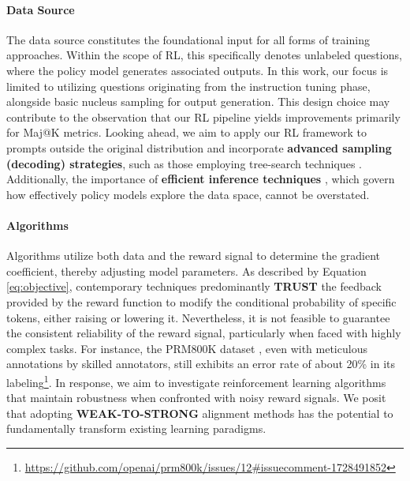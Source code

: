 \begin{itemize}[topsep=0pt]
\paragraph{Data Source} The data source constitutes the foundational input for all forms of training approaches. Within the scope of RL, this specifically denotes unlabeled questions, where the policy model generates associated outputs. In this work, our focus is limited to utilizing questions originating from the instruction tuning phase, alongside basic nucleus sampling for output generation. This design choice may contribute to the observation that our RL pipeline yields improvements primarily for Maj@K metrics. Looking ahead, we aim to apply our RL framework to prompts outside the original distribution and incorporate \textbf{advanced sampling (decoding) strategies}, such as those employing tree-search techniques \citep{yao2023tree}. Additionally, the importance of \textbf{efficient inference techniques} \citep{xia-etal-2023-speculative,leviathan2023fast,kwon2023efficient,xia2024unlocking}, which govern how effectively policy models explore the data space, cannot be overstated.

\paragraph{Algorithms} Algorithms utilize both data and the reward signal to determine the gradient coefficient, thereby adjusting model parameters. As described by Equation \ref{eq:objective}, contemporary techniques predominantly \textbf{TRUST} the feedback provided by the reward function to modify the conditional probability of specific tokens, either raising or lowering it. Nevertheless, it is not feasible to guarantee the consistent reliability of the reward signal, particularly when faced with highly complex tasks. For instance, the PRM800K dataset \citep{lightman2023let}, even with meticulous annotations by skilled annotators, still exhibits an error rate of about 20\% in its labeling\footnote{\url{https://github.com/openai/prm800k/issues/12\#issuecomment-1728491852}}. In response, we aim to investigate reinforcement learning algorithms that maintain robustness when confronted with noisy reward signals. We posit that adopting \textbf{WEAK-TO-STRONG} \citep{burns2023weak} alignment methods has the potential to fundamentally transform existing learning paradigms.


\end{itemize}
